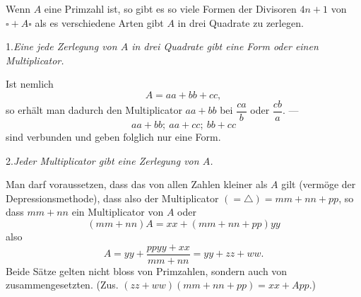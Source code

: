 \NoSourceHead
{}
\par\indent Wenn $A$ eine Primzahl ist, so gibt es so viele Formen der Divisoren
$4n+1$ von $\square+A\square$ als es verschiedene Arten gibt $A$ in drei Quadrate zu
zerlegen.
\par\medskip\noindent\hspace*{\parindent}
\par\noindent\hspace*{\parindent}1.\quad\textit{Eine jede Zerlegung von $A$ in drei Quadrate gibt eine Form oder einen Multiplicator.}

Ist nemlich
\[
A=aa+bb+cc,
\]
\noindent so erhält man dadurch den Multiplicator $aa+bb$ bei $\dfrac{ca}{b}$ oder $\dfrac{cb}{a}$. —
\[
aa+bb;\ aa+cc;\ bb+cc
\]
\noindent sind verbunden und geben folglich nur eine Form.
\par\noindent\hspace*{\parindent}2.\quad\textit{Jeder Multiplicator gibt eine Zerlegung von $A$.}

Man darf voraussetzen, dass das von allen Zahlen kleiner als $A$ gilt
(vermöge der Depressionsmethode), dass also der Multiplicator $(=\triangle)=mm+nn+pp$, so dass $mm+nn$ ein Multiplicator von $A$ oder
\[
(mm+nn)A=xx+(mm+nn+pp)yy
\]
\noindent also
\[
A=yy+\frac{ppyy+xx}{mm+nn}=yy+zz+ww.
\]
\clearpage
{}
\noindent Beide Sätze gelten nicht bloss von Primzahlen, sondern auch von zusammengesetzten. (Zus. $(zz+ww)(mm+nn+pp)=xx+App.$)


